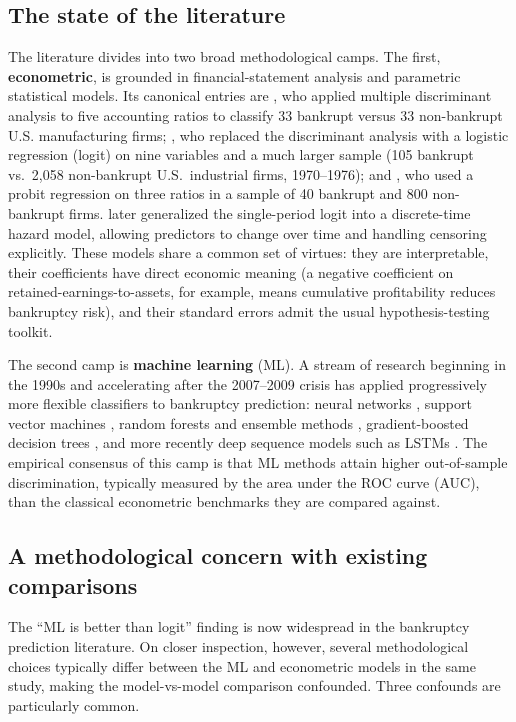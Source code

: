 \documentclass[11pt,a4paper]{article}
\begin{document}
\subsection{The state of the literature}

The literature divides into two broad methodological camps. The first,
\textbf{econometric}, is grounded in financial-statement analysis and
parametric statistical models. Its canonical entries are
\cite{altman1968}, who applied multiple discriminant analysis to five
accounting ratios to classify 33 bankrupt versus 33 non-bankrupt U.S.
manufacturing firms; \cite{ohlson1980}, who replaced the discriminant analysis
with a logistic regression (logit) on nine variables and a much larger sample
(105 bankrupt vs.\ 2,058 non-bankrupt U.S.\ industrial firms, 1970--1976); and
\cite{zmijewski1984}, who used a probit regression on three ratios in a
sample of 40 bankrupt and 800 non-bankrupt firms. \cite{shumway2001} later
generalized the single-period logit into a discrete-time hazard model,
allowing predictors to change over time and handling censoring explicitly.
These models share a common set of virtues: they are interpretable, their
coefficients have direct economic meaning (a negative coefficient on
retained-earnings-to-assets, for example, means cumulative profitability
reduces bankruptcy risk), and their standard errors admit the usual
hypothesis-testing toolkit.

The second camp is \textbf{machine learning} (ML). A stream of research
beginning in the 1990s and accelerating after the 2007--2009 crisis has
applied progressively more flexible classifiers to bankruptcy prediction:
neural networks \citep{altman1994}, support vector machines
\citep{shin2005, min2005}, random forests and ensemble methods
\citep{barboza2017}, gradient-boosted decision trees
\citep{zieba2016, carmona2019}, and more recently deep sequence models such as
LSTMs \citep{mai2019, pellegrino2024}. The empirical consensus of this camp
is that ML methods attain higher out-of-sample discrimination, typically
measured by the area under the ROC curve (AUC), than the classical
econometric benchmarks they are compared against.

\subsection{A methodological concern with existing comparisons}

The ``ML is better than logit'' finding is now widespread in the bankruptcy
prediction literature. On closer inspection, however, several methodological
choices typically differ between the ML and econometric models in the
same study, making the model-vs-model comparison confounded. Three confounds
are particularly common.
\end{document}

